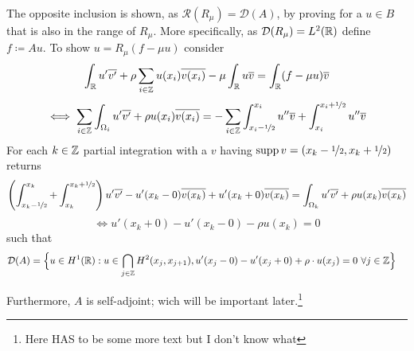 The opposite inclusion is shown, as $\mathcal{R}(R_{\mu}) = \mathcal{D}(A)$, by proving for a $u \in B$ that is also in the range of $R_{\mu}$. More specifically, as $\mathcal{D}(R_{\mu}) = L^{2}(\mathbb{R})$ define $f \coloneqq A u$. To show $u = R_{\mu}(f - \mu u)$ consider
	\[ \int_{\mathbb{R}} u' \overline{v'} + \rho \sum_{i \in \mathbb{Z}} u(x_{i}) \overline{v(x_{i})} - \mu \int_{\mathbb{R}} u \overline{v}= \int_{\mathbb{R}}(f-\mu u) \overline{v} \]
	\[ \iff \sum_{i \in \mathbb{Z}} \int_{\Omega_{i}} u' \overline{v'} + \rho u(x_{i}) \overline{v(x_{i})} = - \sum_{i \in \mathbb{Z}} \int_{x_{i} - \nicefrac{1}{2}}^{x_{i}} u'' \overline{v} + \int_{x_{i}}^{x_{i} + \nicefrac{1}{2}} u'' \overline{v} \]
	For each $k \in \mathbb{Z}$ partial integration with a $v$ having $\operatorname{supp} v = (x_{k} - \nicefrac{1}{2}, x_{k} + \nicefrac{1}{2})$ returns
	\[ \left( \int_{x_{k} - \nicefrac{1}{2}}^{x_{k}} + \int_{x_{k}}^{x_{k} +\nicefrac{1}{2}} \right) u' \overline{v'} - u'(x_{k}-0) \overline{v(x_{k})}  + u'(x_{k}+0) \overline{v(x_{k})}  = \int_{\Omega_{k}} u' \overline{v'} + \rho u(x_{k}) \overline{v(x_{k})} \]
	\[ \iff u'(x_{k}+0) - u'(x_{k}-0) - \rho u(x_{k}) = 0 \]
	such that
	\begin{align*}
		\mathcal{D}(A) & = \Big\{ u \in H^{1}(\mathbb{R}): u \in \bigcap_{j \in \mathbb{Z}} H^{2}(x_{j} , x_{j+1}), u'(x_{j} - 0) - u'(x_{j} + 0) + \rho \cdot u(x_{j}) = 0 ~\forall j \in \mathbb{Z} \Big\}
	\end{align*}

Furthermore, $A$ is self-adjoint; wich will be important later.\footnote{Here HAS to be some more text but I don't know what}
\newpage %

